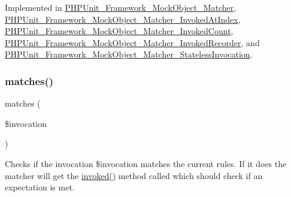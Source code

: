 Implemented in \mbox{\hyperlink{class_p_h_p_unit___framework___mock_object___matcher_a63f37b06181c9547bc3c225007c34425}{P\+H\+P\+Unit\+\_\+\+Framework\+\_\+\+Mock\+Object\+\_\+\+Matcher}}, \mbox{\hyperlink{class_p_h_p_unit___framework___mock_object___matcher___invoked_at_index_a63f37b06181c9547bc3c225007c34425}{P\+H\+P\+Unit\+\_\+\+Framework\+\_\+\+Mock\+Object\+\_\+\+Matcher\+\_\+\+Invoked\+At\+Index}}, \mbox{\hyperlink{class_p_h_p_unit___framework___mock_object___matcher___invoked_count_a63f37b06181c9547bc3c225007c34425}{P\+H\+P\+Unit\+\_\+\+Framework\+\_\+\+Mock\+Object\+\_\+\+Matcher\+\_\+\+Invoked\+Count}}, \mbox{\hyperlink{class_p_h_p_unit___framework___mock_object___matcher___invoked_recorder_a63f37b06181c9547bc3c225007c34425}{P\+H\+P\+Unit\+\_\+\+Framework\+\_\+\+Mock\+Object\+\_\+\+Matcher\+\_\+\+Invoked\+Recorder}}, and \mbox{\hyperlink{class_p_h_p_unit___framework___mock_object___matcher___stateless_invocation_a63f37b06181c9547bc3c225007c34425}{P\+H\+P\+Unit\+\_\+\+Framework\+\_\+\+Mock\+Object\+\_\+\+Matcher\+\_\+\+Stateless\+Invocation}}.

\mbox{\label{interface_p_h_p_unit___framework___mock_object___matcher___invocation_a4988c6fa11e275302172d0a4ae32dd3a}} 
\subsubsection{\texorpdfstring{matches()}{matches()}}
{\footnotesize\ttfamily matches (\begin{DoxyParamCaption}\item[{\mbox{\hyperlink{interface_p_h_p_unit___framework___mock_object___invocation}{P\+H\+P\+Unit\+\_\+\+Framework\+\_\+\+Mock\+Object\+\_\+\+Invocation}}}]{\$invocation }\end{DoxyParamCaption})}

Checks if the invocation \$invocation matches the current rules. If it does the matcher will get the \mbox{\hyperlink{interface_p_h_p_unit___framework___mock_object___matcher___invocation_a63f37b06181c9547bc3c225007c34425}{invoked()}} method called which should check if an expectation is met.


